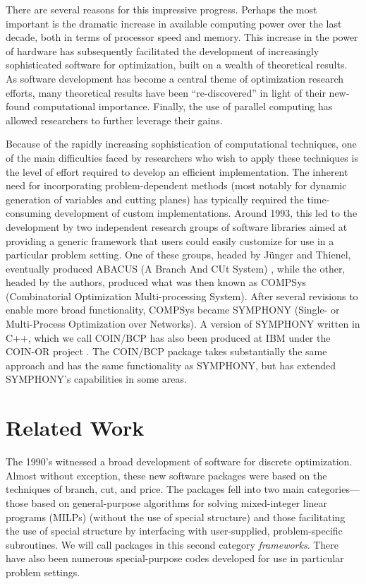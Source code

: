 There are several reasons for this impressive progress. Perhaps the most
important is the dramatic increase in available computing power over the last
decade, both in terms of processor speed and memory. This increase in the
power of hardware has subsequently facilitated the development of increasingly
sophisticated software for optimization, built on a wealth of theoretical
results. As software development has become a central theme of optimization
research efforts, many theoretical results have been ``re-discovered'' in
light of their new-found computational importance. Finally, the use of
parallel computing has allowed researchers to further leverage their gains.

Because of the rapidly increasing sophistication of computational techniques,
one of the main difficulties faced by researchers who wish to apply these
techniques is the level of effort required to develop an efficient
implementation. The inherent need for incorporating problem-dependent methods
(most notably for dynamic generation of variables and cutting planes) has
typically required the time-consuming development of custom implementations.
Around 1993, this led to the development by two independent research groups of
software libraries aimed at providing a generic framework that users could
easily customize for use in a particular problem setting. One of these groups,
headed by J\"unger and Thienel, eventually produced ABACUS (A Branch And CUt
System) \cite{abacus1}, while the other, headed by the authors, produced what
was then known as COMPSys (Combinatorial Optimization Multi-processing
System). After several revisions to enable more broad functionality, COMPSys
became SYMPHONY (Single- or Multi-Process Optimization over Networks). A
version of SYMPHONY written in C++, which we call COIN/BCP has also been
produced at IBM under the COIN-OR project \cite{coin-or}. The COIN/BCP package
takes substantially the same approach and has the same functionality as
SYMPHONY, but has extended SYMPHONY's capabilities in some areas.

\section{Related Work}
\label{related}

The 1990's witnessed a broad development of software for discrete
optimization. Almost without exception, these new software packages were based
on the techniques of branch, cut, and price. The packages fell into two main
categories---those based on general-purpose algorithms for solving
mixed-integer linear programs (MILPs) (without the use of special structure)
and those facilitating the use of special structure by interfacing with
user-supplied, problem-specific subroutines. We will call packages in this
second category {\em frameworks}. There have also been numerous
special-purpose codes developed for use in particular problem settings.

